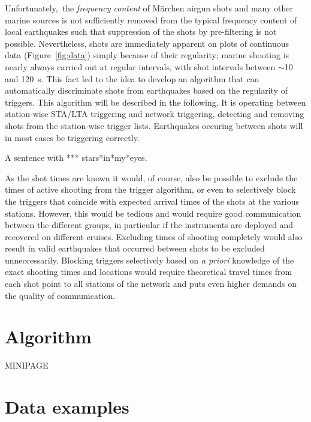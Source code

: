 \documentclass[11pt]{article}
\begin{document}
Unfortunately,\ the {\em frequency content} of M\"{a}rchen
airgun shots and many other marine sources is not sufficiently removed from the typical frequency
content of local earthquakes such that suppression of the shots by %
pre-filtering is not possible.    Nevertheless, shots are immediately
apparent on plots of continuous data (Figure~\ref{fig:data})
simply because of their regularity; marine shooting is nearly always
carried out at regular intervals, with shot intervals between
$\sim$10 and 120~s.   This fact led to the idea to develop
an algorithm that can automatically discriminate shots from
earthquakes based on the regularity of triggers.  This algorithm will
be described in the following.  It is operating between station-wise STA/LTA
triggering and network triggering, detecting and removing shots from
the station-wise trigger lists.   Earthquakes occuring between shots
will in most cases be triggering correctly.

A sentence with *** stars*in*my*eyes.

  As the shot times are known it would, of course, also be possible to
  exclude the times of active shooting 
from the trigger algorithm, or even to selectively block the
triggers that coincide with expected arrival times of the shots at the
various stations.  However, this would be tedious and would require
good communication between the different groups, in particular if the
instruments are deployed and recovered on different cruises.
Excluding times of shooting completely would also result in valid
earthquakes that occurred between shots to be excluded
unneccessarily.  Blocking triggers selectively based on {\it a priori}
knowledge of the exact shooting times and locations would require theoretical travel times
from each shot point to all stations of the network and puts even
higher demands on the quality of communication.


\section{Algorithm}

\begin{minipage}[b]{5cm}
MINIPAGE
\end{minipage}

\section{Data examples}
\end{document}
